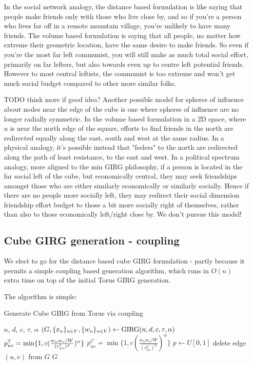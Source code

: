 In the social network analogy, the distance based formulation is like saying that people make friends only with those who live close by, and so if you're a person who lives far off in a remote mountain village, you're unlikely to have many friends. The volume based formulation is saying that all people, no matter how extreme their geometric location, have the same desire to make friends. So even if you're the most far left communist, you will still make as much total social effort, primarily on far lefters, but also towards even up to centre left potential friends. However to most central leftists, the communist is too extreme and won't get much social budget compared to other more similar folks.

TODO think more if good idea?
Another possible model for spheres of influence about nodes near the edge of the cube is one where spheres of influence are no longer radially symmetric. In the volume based formulation in a 2D space, where $u$ is near the north edge of the square, efforts to find friends in the north are redirected equally along the east, south and west at the same radius. In a physical analogy, it's possible instead that "feelers" to the north are redirected along the path of least resistance, to the east and west. In a political spectrum analogy, more aligned to the min GIRG philosophy, if a person is located in the far social left of the cube, but economically central, they may seek friendships amongst those who are either similarly economically or similarly socially. Hence if there are no people more socially left, they may redirect their social dimension friendship effort budget to those a bit more socially right of themselves, rather than also to those economically left/right close by. We don't pursue this model!

\subsection{Cube GIRG generation - coupling}
We elect to go for the distance based cube GIRG formulation - partly because it permits a simple coupling based generation algorithm, which runs in $O(n)$ extra time on top of the initial Torus GIRG generation.

The algorithm is simple:

\begin{algorithm}
    \caption{Generate Cube GIRG from Torus via coupling}\label{alg:cap}
    \begin{algorithmic}
    \Require $n$, $d$, $c$, $\tau$, $\alpha$
    \State $\left ( G, \{x_u\}_{u \in V}, \{w_u\}_{u \in V} \right ) \gets \operatorname{GIRG}(n,d,c,\tau, \alpha)$
        \State $p_{uv}^{\mathbb{T}} = \min \{1, c (\frac{w_u w_v / W}{(r_{uv}^{\mathbb{T}})^d})^\alpha \}$
        \State $p_{uv}^C = \min \{1, c (\frac{w_u w_v / W}{(r_{uv}^C)^d})^\alpha \}$
        \State $p \gets U[0,1]$
            \State delete edge $(u,v)$ from $G$
        \EndIf
    \EndFor
    \State \Return $G$
\end{algorithmic}
\end{algorithm}



